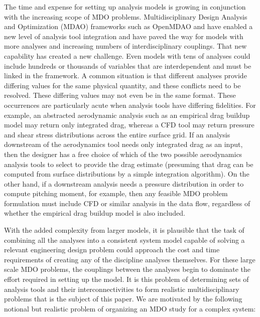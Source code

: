     The time and expense for setting up 
    analysis models is growing in conjunction with the increasing scope of MDO problems. 
    Multidisciplinary Design Analysis and Optimization (MDAO)
    frameworks such as OpenMDAO\cite{Gray2012} and  have enabled a new level of analysis tool integration 
    and have paved the way for models with more analyses and increasing numbers of interdisciplinary couplings. That 
    new capability has created a new challenge. Even models with tens of analyses could include hundreds or thousands
    of variables that are interdependent and must be linked in the framework. 
    A common situation is that different analyses provide differing values for the 
    same physical quantity, and these conflicts need to be resolved. These differing values 
    may not even be in the same format. These occurrences are particularly acute when analysis tools have differing fidelities. For
    example, an abstracted aerodynamic analysis such as an empirical drag buildup model may return only
    integrated drag, whereas a CFD tool may return pressure and shear stress distributions across the entire
    surface grid. If an analysis downstream of the aerodynamics tool needs only integrated drag as an input,
    then the designer has a free choice of which of the two possible aerodynamics analysis tools to select to
    provide the drag estimate (presuming that drag can be computed from surface distributions by a simple
    integration algorithm). On the other hand, if a downstream analysis needs a pressure distribution in
    order to compute pitching moment, for example, then any feasible MDO problem formulation must
    include CFD or similar analysis in the data flow, regardless of whether the empirical drag buildup model
    is also included.

    With the added complexity from larger models, it is plausible that the task of combining all the analyses into a 
    consistent system model capable of solving a relevant engineering design 
    problem could approach the cost and time requirements of creating any of the discipline 
    analyses themselves. For these large scale MDO problems, the couplings between the 
    analyses begin to dominate the effort required in setting up the model. It is this problem of 
    determining sets of analysis tools and their interconnectivities to form realistic
    multidisciplinary problems that is the subject of this paper. We are motivated by the following notional
    but realistic problem of organizing an MDO study for a complex system:

